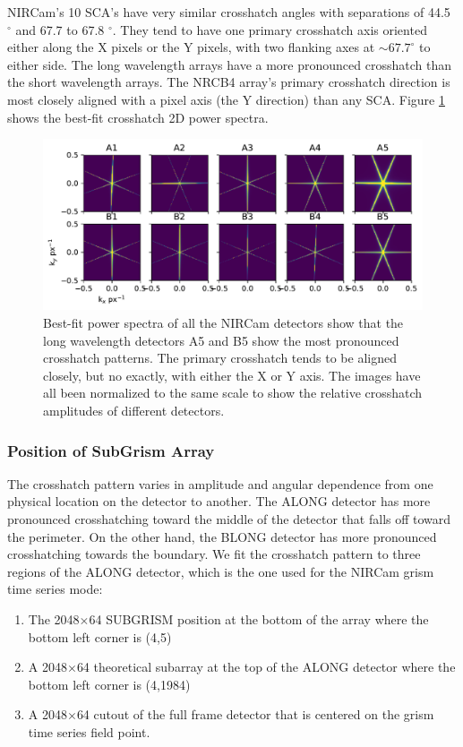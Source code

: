 \documentclass{aastex62}
\newcommand{\degree}{^\circ}
\begin{document}
NIRCam's 10 SCA's have very similar crosshatch angles with separations of 44.5 $\degree$ and 67.7 to 67.8 $\degree$.
They tend to have one primary crosshatch axis oriented either along the X pixels or the Y pixels, with two flanking axes at $\sim 67.7 \degree$ to either side.
The long wavelength arrays have a more pronounced crosshatch than the short wavelength arrays.
The NRCB4 array's primary crosshatch direction is most closely aligned with a pixel axis (the Y direction) than any SCA.
Figure \ref{fig:crosshatchModelGallery} shows the best-fit crosshatch 2D power spectra.

\begin{figure}[!hbtp]
\centering
\includegraphics[width=.99\columnwidth]{psd_models_gallery.pdf}
\caption{
Best-fit power spectra of all the NIRCam detectors show that the long wavelength detectors A5 and B5 show the most pronounced crosshatch patterns.
The primary crosshatch tends to be aligned closely, but no exactly, with either the X or Y axis.
The images have all been normalized to the same scale to show the relative crosshatch amplitudes of different detectors.
}\label{fig:crosshatchModelGallery}
\end{figure}

\clearpage
\subsubsection{Position of SubGrism Array}

The crosshatch pattern varies in amplitude and angular dependence from one physical location on the detector to another.
The ALONG detector has more pronounced crosshatching toward the middle of the detector that falls off toward the perimeter.
On the other hand, the BLONG detector has more pronounced crosshatching towards the boundary.
We fit the crosshatch pattern to three regions of the ALONG detector, which is the one used for the NIRCam grism time series mode:
\begin{enumerate}
	\item The 2048$\times$64 SUBGRISM position at the bottom of the array where the bottom left corner is (4,5) \label{subgrism64pos}
	\item A 2048$\times$64 theoretical subarray at the top of the ALONG detector where the bottom left corner is (4,1984)
	\item A 2048$\times$64 cutout of the full frame detector that is centered on the grism time series field point.
\end{enumerate}
\end{document}
